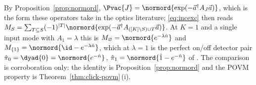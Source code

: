 
\begin{remark}\label{rem:normordelements}
By Proposition~\ref{prop:normord}, $\Pvac{J}=\normord{\exp(-\vec
a^\dagger A_J\vec a)}$, which is the form these operators take in the optics
literature; \eqref{eq:incexc} then reads
$M_S=\sum_{T\subseteq S}(-1)^{|T|}\normord{\exp(-\vec a^\dagger
A_{([K]\setminus S)\cup T}\vec a)}$. At $K=1$ and a single input mode with
$A_1=\lambda$ this is $M_\varnothing=\normord{e^{-\lambda\hat n}}$ and
$M_{\{1\}}=\normord{\id-e^{-\lambda\hat n}}$, which at $\lambda=1$ is the
perfect on/off detector pair $\hat\pi_0=\dyad{0}=\normord{e^{-\hat n}}$,
$\hat\pi_1=\normord{\hat 1-e^{-\hat n}}$ of
\cite[Eq.~(6)]{sperling2012}. The comparison is corroboration only: the
identity is Proposition~\ref{prop:normord} and the POVM property is
Theorem~\ref{thm:click-povm}\,(i).
\end{remark}
